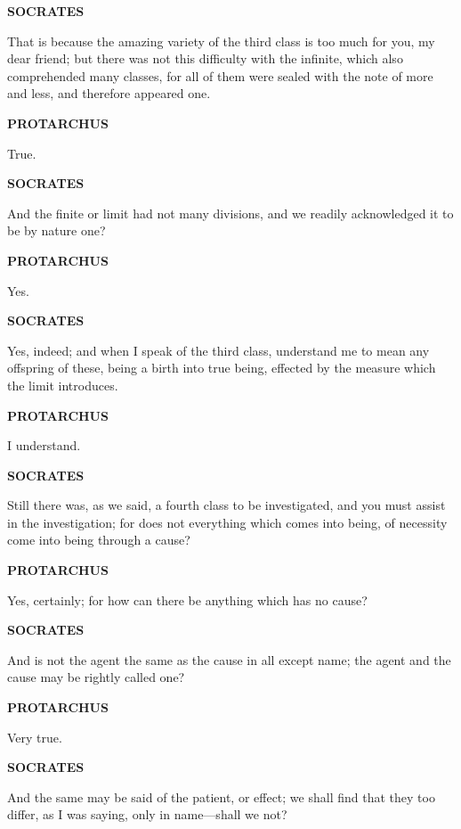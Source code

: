 \documentclass[11pt,letter]{article}
\begin{document}
\par \textbf{SOCRATES}
\par   That is because the amazing variety of the third class is too much for you, my dear friend; but there was not this difficulty with the infinite, which also comprehended many classes, for all of them were sealed with the note of more and less, and therefore appeared one.

\par \textbf{PROTARCHUS}
\par   True.

\par \textbf{SOCRATES}
\par   And the finite or limit had not many divisions, and we readily acknowledged it to be by nature one?

\par \textbf{PROTARCHUS}
\par   Yes.

\par \textbf{SOCRATES}
\par   Yes, indeed; and when I speak of the third class, understand me to mean any offspring of these, being a birth into true being, effected by the measure which the limit introduces.

\par \textbf{PROTARCHUS}
\par   I understand.

\par \textbf{SOCRATES}
\par   Still there was, as we said, a fourth class to be investigated, and you must assist in the investigation; for does not everything which comes into being, of necessity come into being through a cause?

\par \textbf{PROTARCHUS}
\par   Yes, certainly; for how can there be anything which has no cause?

\par \textbf{SOCRATES}
\par   And is not the agent the same as the cause in all except name; the agent and the cause may be rightly called one?

\par \textbf{PROTARCHUS}
\par   Very true.

\par \textbf{SOCRATES}
\par   And the same may be said of the patient, or effect; we shall find that they too differ, as I was saying, only in name—shall we not?
\end{document}
